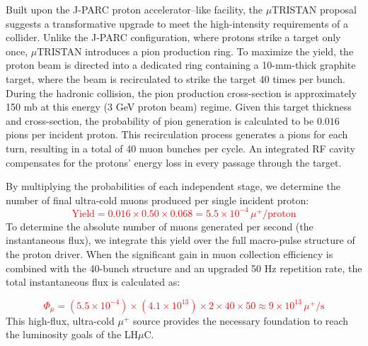 \documentclass[a4paper,11pt]{article}
\begin{document}
Built upon the J-PARC proton accelerator–like facility, the $\mu$TRISTAN proposal suggests a transformative upgrade to meet the high-intensity requirements of a collider. Unlike the J-PARC configuration, where protons strike a target only once, $\mu$TRISTAN introduces a pion production ring. To maximize the yield, the proton beam is directed into a dedicated ring containing a 10-mm-thick graphite target, where the beam is recirculated to strike the target 40 times per bunch. During the hadronic collision, the pion production cross-section is approximately 150 mb at this energy (3 GeV proton beam) regime. Given this target thickness and cross-section, the probability of pion generation is calculated to be $0.016$ pions per incident proton. This recirculation process generates a pions for each turn, resulting in a total of 40 muon bunches per cycle. An integrated RF cavity compensates for the protons' energy loss in every passage through the target.

By multiplying the probabilities of each independent stage, we determine the number of final ultra-cold muons produced per single incident proton:
\textcolor{red}{
$$ \text{Yield} = 0.016 \times 0.50 \times 0.068 = 5.5 \times 10^{-4} \, \mu^+/\text{proton} $$
}
To determine the absolute number of muons generated per second (the instantaneous flux), we integrate this yield over the full macro-pulse structure of the proton driver. When the significant gain in muon collection efficiency is combined with the 40-bunch structure and an upgraded 50 Hz repetition rate, the total instantaneous flux is calculated as:

\textcolor{red}{
$$ \Phi_{\mu} = \left(5.5 \times 10^{-4}\right) \times \left(4.1 \times 10^{13}\right) \times 2 \times 40 \times 50 \approx 9 \times 10^{13} \, \mu^+/\text{s} $$
}
This high-flux, ultra-cold $\mu^+$ source provides the necessary foundation to reach the luminosity goals of the LH$\mu$C.
\end{document}
